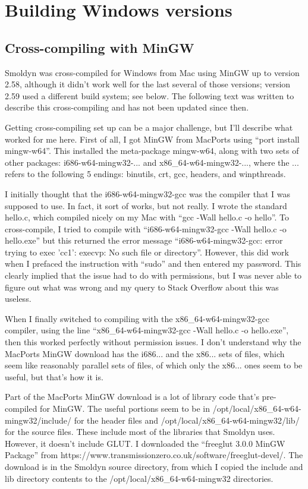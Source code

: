\documentclass {book}
\begin{document}
\section{Building Windows versions}

\subsection{Cross-compiling with MinGW}

Smoldyn was cross-compiled for Windows from Mac using MinGW up to version 2.58, although it didn't work well for the last several of those versions; version 2.59 used a different build system; see below. The following text was written to describe this cross-compiling and has not been updated since then.

Getting cross-compiling set up can be a major challenge, but I'll describe what worked for me here. First of all, I got MinGW from MacPorts using ``port install mingw-w64''. This installed the meta-package mingw-w64, along with two sets of other packages: i686-w64-mingw32-... and x86\_64-w64-mingw32-..., where the ... refers to the following 5 endings: binutils, crt, gcc, headers, and winpthreads.

I initially thought that the i686-w64-mingw32-gcc was the compiler that I was supposed to use. In fact, it sort of works, but not really. I wrote the standard hello.c, which compiled nicely on my Mac with ``gcc -Wall hello.c -o hello''. To cross-compile, I tried to compile with ``i686-w64-mingw32-gcc -Wall hello.c -o hello.exe'' but this returned the error message ``i686-w64-mingw32-gcc: error trying to exec 'cc1': execvp: No such file or directory''. However, this did work when I prefaced the instruction with ``sudo'' and then entered my password. This clearly implied that the issue had to do with permissions, but I was never able to figure out what was wrong and my query to Stack Overflow about this was useless.

When I finally switched to compiling with the x86\_64-w64-mingw32-gcc compiler, using the line ``x86\_64-w64-mingw32-gcc -Wall hello.c -o hello.exe'', then this worked perfectly without permission issues. I don't understand why the MacPorts MinGW download has the i686... and the x86... sets of files, which seem like reasonably parallel sets of files, of which only the x86... ones seem to be useful, but that's how it is.

Part of the MacPorts MinGW download is a lot of library code that's pre-compiled for MinGW. The useful portions seem to be in /opt/local/x86\_64-w64-mingw32/include/ for the header files and /opt/local/x86\_64-w64-mingw32/lib/ for the source files. These include most of the libraries that Smoldyn uses. However, it doesn't include GLUT. I downloaded the ``freeglut 3.0.0 MinGW Package'' from https://www.transmissionzero.co.uk/software/freeglut-devel/. The download is in the Smoldyn source directory, from which I copied the include and lib directory contents to the /opt/local/x86\_64-w64-mingw32 directories.
\end{document}
